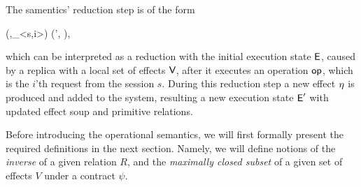 The samentics' reduction step is of the form
\begin{smathpar}
(\E,\op_{<s,i>}) \;\xrightarrow{\V}\; (\E', \eff),
\end{smathpar}
which can be interpreted as a reduction with the initial execution state ${\normalfont \textsf{E}}$, caused by a replica with a local 
set of effects ${\normalfont \textsf{V}}$, after it executes an operation
${\normalfont \textsf{op}}$, which is the $i$'th request from the session $s$. 
During this reduction step a new effect $\eta$ is produced and added to
the system, resulting a new execution state ${\normalfont \textsf{E}}'$ with updated effect
soup and primitive relations.

Before introducing the operational semantics, we will first formally
present the required definitions in the next section. Namely, we will define  
notions of the \emph{inverse} of a given relation $R$, and the \emph{maximally
closed subset} of a given set of effects $V$ under a contract $\psi$. 




